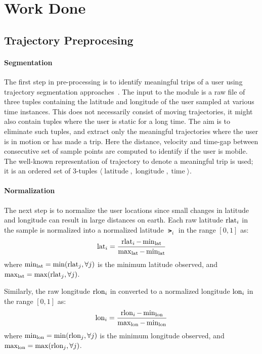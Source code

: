 \section{Work Done}
\subsection{Trajectory Preprocesing} 

\paragraph{Segmentation}
The first step in pre-processing is to identify meaningful trips of a user using trajectory segmentation approaches~\cite{Zheng2008}. The input to the module is a raw file of three tuples containing the latitude and longitude of the user sampled at various time instances. This does not necessarily consist of moving trajectories, it might also contain tuples where the user is static for a long time. The aim is to eliminate such tuples, and extract only the meaningful trajectories where the user is in motion or has made a trip. Here the distance, velocity and time-gap between consecutive set of sample points are computed to identify if the user is mobile. The well-known representation of trajectory to denote a meaningful trip is used; it is an ordered set of 3-tuples $\langle \operatorname{latitude},\operatorname{longitude},\operatorname{time} \rangle$.
\paragraph{Normalization}
The next step is to normalize the user locations since small changes in latitude and longitude can result in large distances on earth. Each raw latitude $\operatorname{rlat}_i$ in the sample is normalized into a normalized latitude $\lat_i$ in the range $[0,1]$ as:
\begin{eqnarray}
\operatorname{lat}_i =\frac{\operatorname{rlat}_i - \min_{\operatorname{lat}}}{\max_{\operatorname{lat}} - \min_{\operatorname{lat}}}
\end{eqnarray}
where $\min_{\operatorname{lat}}=\min(\operatorname{rlat}_j, \forall j)$ is the minimum latitude observed, and $\max_{\operatorname{lat}}=\max(\operatorname{rlat}_j, \forall j)$. 

Similarly, the raw longitude $\operatorname{rlon}_i$ in converted to a normalized longitude $\operatorname{lon}_i$ in the range $[0,1]$ as:
\begin{eqnarray}
\operatorname{lon}_i =\frac{\operatorname{rlon}_i - \min_{\operatorname{lon}}}{\max_{\operatorname{lon}} - \min_{\operatorname{lon}}}
\end{eqnarray}
where $\min_{\operatorname{lon}}=\min(\operatorname{rlon}_j, \forall j)$ is the minimum longitude observed, and $\max_{\operatorname{lon}}=\max(\operatorname{rlon}_j, \forall j)$. 


